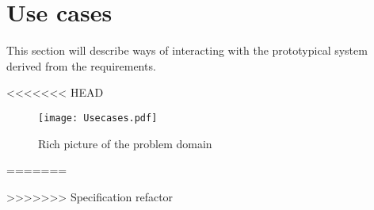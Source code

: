 \section{Use cases}\label{sec:usecases}

This section will describe ways of interacting with the prototypical system derived from the requirements.

<<<<<<< HEAD
\begin{figure}
 \centering 
 \texttt{[image: Usecases.pdf]}
 \caption{Rich picture of the problem domain}
\end{figure}
=======

>>>>>>> Specification refactor
